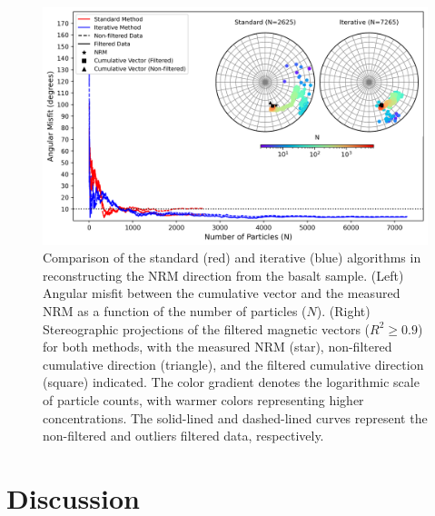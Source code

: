 \begin{figure}[tb!]
  \centering
  \includegraphics[width=1\linewidth]{paper/figures/basalt-data-stereoplot.png}
  \caption{
  Comparison of the standard (red) and iterative (blue) algorithms in reconstructing the NRM direction from the basalt sample. (Left) Angular misfit between the cumulative vector and the measured NRM as a function of the number of particles ($N$). (Right) Stereographic projections of the filtered magnetic vectors ($R^2 \geq 0.9$) for both methods, with the measured NRM (star), non-filtered cumulative direction (triangle), and the filtered cumulative direction (square) indicated. The color gradient denotes the logarithmic scale of particle counts, with warmer colors representing higher concentrations. The solid-lined and dashed-lined curves represent the non-filtered and outliers filtered data, respectively.
  }
  \label{basalt-data-stereograms}
\end{figure}

\section{Discussion}

